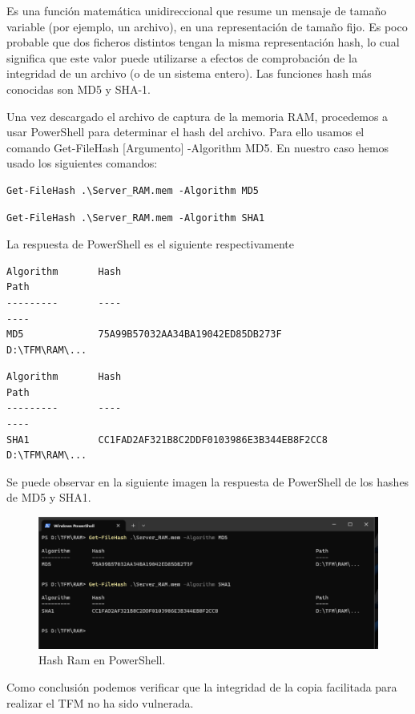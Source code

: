 Es una función matemática unidireccional que resume un mensaje de tamaño variable (por ejemplo, un archivo), en una representación de tamaño fijo. Es poco probable que dos ficheros distintos tengan la misma representación hash, lo cual significa que este valor puede utilizarse a efectos de comprobación de la integridad de un archivo (o de un sistema entero). Las funciones hash más conocidas son MD5 y SHA-1.

Una vez descargado el archivo de captura de la memoria RAM, procedemos a usar PowerShell para determinar el hash del archivo. Para ello usamos el comando  Get-FileHash [Argumento] -Algorithm MD5. En nuestro caso hemos usado los siguientes comandos:


\begin{verbatim}
Get-FileHash .\Server_RAM.mem -Algorithm MD5
\end{verbatim}


\begin{verbatim}
Get-FileHash .\Server_RAM.mem -Algorithm SHA1
\end{verbatim}



La respuesta de PowerShell es el siguiente respectivamente

\begin{verbatim}
Algorithm       Hash                                                                   Path
---------       ----                                                                   ----
MD5             75A99B57032AA34BA19042ED85DB273F                                       D:\TFM\RAM\...
\end{verbatim}

\begin{verbatim}
Algorithm       Hash                                                                   Path
---------       ----                                                                   ----
SHA1            CC1FAD2AF321B8C2DDF0103986E3B344EB8F2CC8                               D:\TFM\RAM\...
\end{verbatim}

Se puede observar en la siguiente imagen la respuesta de PowerShell de los hashes de MD5 y SHA1.

\begin{figure}[htp]
    \centering
    \includegraphics[width=1.0\textwidth]{imagenes/008-captura-hash-PowerShell.png}
    \caption{Hash Ram en PowerShell.}
    \label{Hash Ram en PowerShell.}
\end{figure}

Como conclusión podemos verificar que la integridad de la copia facilitada para realizar el TFM no ha sido vulnerada.